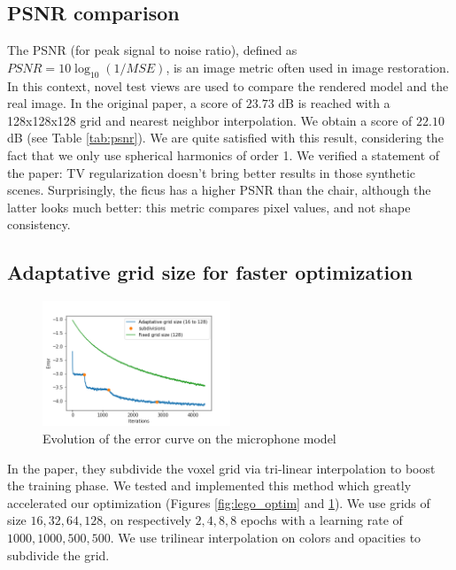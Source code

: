 \documentclass{article}
\begin{document}
\subsection{PSNR comparison}

The PSNR (for peak signal to noise ratio), defined as $PSNR = 10\log_{10}(1/MSE)$, is an image metric often used in image restoration. In this context, novel test views are used to compare the rendered model and the real image. In the original paper, a score of $23.73$ dB is reached with a 128x128x128 grid and nearest neighbor interpolation. We obtain a score of $22.10$ dB (see Table \ref{tab:psnr}). We are quite satisfied with this result, considering the fact that we only use spherical harmonics of order 1. We verified a statement of the paper: TV regularization doesn't bring better results in those synthetic scenes. Surprisingly, the ficus has a higher PSNR than the chair, although the latter looks much better: this metric compares pixel values, and not shape consistency. 

\subsection{Adaptative grid size for faster optimization}


\begin{figure}[!h]
\centering
\includegraphics[width=0.5\textwidth]{figs/training_mic.png}
\caption{\label{fig:subd} Evolution of the error curve on the microphone model}
\end{figure}

In the paper, they subdivide the voxel grid via tri-linear interpolation to boost the training phase. We tested and implemented this method which greatly accelerated our optimization (Figures \ref{fig:lego_optim} and \ref{fig:subd}). We use grids of size ${16, 32, 64, 128}$, on respectively ${2, 4, 8, 8}$ epochs with a learning rate of ${1000, 1000, 500, 500}$. We use trilinear interpolation on colors and opacities to subdivide the grid.
\end{document}

